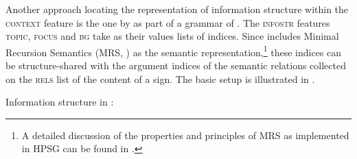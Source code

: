 \documentclass[output=paper
 	        ,biblatex
                ,babelshorthands
                ,newtxmath
                ,draftmode
                ,colorlinks, citecolor=brown
]{langscibook}
\begin{document}
Another approach locating the representation of information structure
within the \textsc{context} feature is the one by
\cite{Paggio2009a-u} as part of a grammar of . The
\textsc{infostr} features \textsc{topic}, \textsc{focus} and
\textsc{bg} take as their values lists of indices. Since
\cite{Paggio2009a-u} includes Minimal Recursion Semantics (MRS,
\citealt{CFPS2005a}) as the semantic representation,\footnote{A detailed
  discussion of the properties and principles of MRS as implemented in
  HPSG can be found in .} these indices
can be structure-shared with the argument indices of the semantic
relations collected on the \textsc{rels} list of the content of a
sign. The basic setup is illustrated in .

\ea\label{fig:paggio-infostr}
Information structure in \cite[149]{Paggio2009a-u}:\\
        \leavevmode
{}
\z
\end{document}
